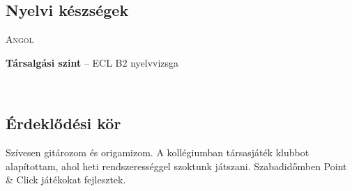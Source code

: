 \documentclass[a4paper, 12pt, draft]{article}
\newlength{\margin}
\newlength{\content}
\newcommand\VRule{\color{lightgray}\vrule width 0.5pt}
\begin{document}
\subsection*{Nyelvi készségek}
\begin{minipage}[t]{\margin}
\end{minipage}
\vspace{0mm}
\begin{minipage}[t]{\margin}
\textsc{Angol}
\end{minipage}
\enspace{\VRule}\enspace
\begin{minipage}[t]{\content}
\textbf{Társalgási szint} – ECL B2 nyelvvizsga
\end{minipage}\vspace{1mm}\\
\vspace{0mm}

\vspace{-5mm}
\subsection*{Érdeklődési kör}
Szívesen gitározom és origamizom. A kollégiumban társasjáték klubbot alapítottam, ahol heti rendszerességgel szoktunk játszani. Szabadidőmben Point \& Click játékokat fejlesztek.
\end{document}
